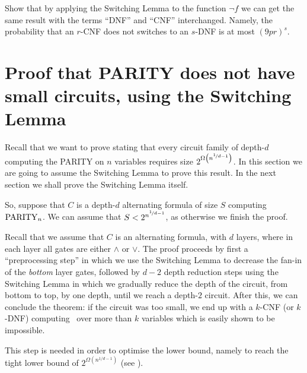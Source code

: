 \begin{exercise} Show that by applying the Switching Lemma to the function $\neg f$ we can get the same result with the terms ``DNF'' and ``CNF'' interchanged. Namely, the probability that an $r$-CNF does not switches to an $s$-DNF is at most $(9pr)^s$.
\end{exercise}

\section{Proof that PARITY does not have small circuits, using the Switching Lemma}

Recall that we want to prove   stating that every circuit family of depth-$d$ computing the PARITY on $n$ variables requires size $2^{\Omega\left(n^{\nicefrac{1}{d-1}}\right)}$. In this section we are going to assume the Switching Lemma to prove this result. In the next section we shall prove the Switching Lemma itself. 

So, suppose  that $C$ is a depth-$d$ alternating formula   of size $S$ computing $\operatorname{PARITY}_n$. We can assume that 
$S< 2^{ n^{\nicefrac{1}{d-1}}}$, as otherwise we finish the proof.


Recall that we assume that $C$ is an alternating formula, with $d$ layers, where in each layer all gates are either $\land$ or $\lor$.  The proof proceeds by first a ``preprocessing step'' in which we use the Switching Lemma to decrease the fan-in of the \emph{bottom} layer gates, followed by   $d-2$ depth reduction steps using the Switching Lemma in which we gradually reduce the depth of the circuit, from bottom to top, by one depth, until we reach a depth-$2$ circuit.
After this, we can conclude the theorem: if the circuit was too small, we end up with a $k$-CNF (or $k$-DNF) computing \Parity\ over more than $k$ variables which is easily shown to be impossible.








This step is needed in order to optimise the lower bound, namely to reach the tight lower bound of $2^{\Omega(n^{1/d-1})}$ (see ).

